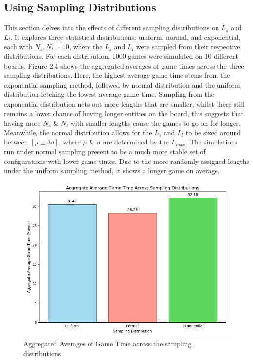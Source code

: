 \documentclass[12pt]{report}
\begin{document}
	\subsection{Using Sampling Distributions}
	This section delves into the effects of different sampling distributions on  $L_{s}$ and $L_{l}$. It explores three statistical distributions: uniform, normal, and exponential, each with $N_s, N_l=10$, where the  $L_{s}$ and $L_{l}$ were sampled from their respective distributions. For each distribution, 1000 games were simulated on 10 different boards. Figure 2.4 shows the aggregated averages of game times across the three sampling distributions. Here, the highest average game time stems from the exponential sampling method, followed by normal distribution and the uniform distribution fetching the lowest average game time. Sampling from the exponential distribution nets out more lengths that are smaller, whilst there still remains a lower chance of having longer entities on the board, this suggests that having more $N_s$ \& $N_l$ with smaller lengths cause the games to go on for longer. Meanwhile, the normal distribution allows for the $L_{s}$ and $L_{l}$ to be sized around between $[\mu \pm 3\sigma]$, where $\mu$ \& $\sigma$ are determined by the $L_{max}$. The simulations run under normal sampling present to be a much more stable set of configurations with lower game times. Due to the more randomly assigned lengths under the uniform sampling method, it shows a longer game on average.
	\begin{figure}
		\centering
		\includegraphics[width=0.6\linewidth]{../withLength/FinalSampling/comparative_aggregate_average_game_times}
		\caption{Aggregated Averages of Game Time across the sampling distributions}
		\label{fig:comparativeaggregateaveragegametimes}
	\end{figure}
\end{document}
